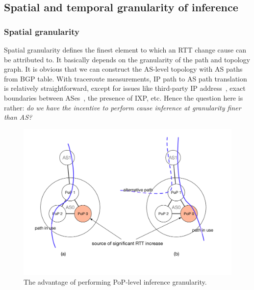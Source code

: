 \subsection{Spatial and temporal granularity of inference}
\label{sec:chap5_precision}

\subsubsection{Spatial granularity}
\label{sec:chap5_spatial}
Spatial granularity defines the finest element to which an RTT change cause can be attributed to.
It basically depends on the granularity of the path and topology graph. 
It is obvious that we can construct the AS-level topology with AS paths from BGP table.
With traceroute measurements, IP path to AS path translation is relatively straightforward, except for issues like third-party IP address~\cite{Hyun2003, Luckie2014a, Zhang2010}, exact boundaries between ASes~\cite{Luckie2016}, the presence of IXP\cite{Nomikos2016}, etc.
Hence the question here is rather: \textit{do we have the incentive to perform cause inference at granularity finer than AS?}

\begin{figure}[!htb]
\centering
\includegraphics[width=.9\textwidth]{gfx/chap5/case_pop_topo.pdf}
\caption{The advantage of performing PoP-level inference granularity.}
\label{fig:chap5_case_pop_topo}
\end{figure}

